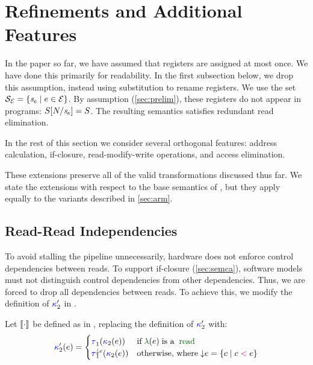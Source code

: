 \section{Refinements and Additional Features} %
\label{sec:additional}

In the paper so far, we have assumed that registers are assigned at most
once.  We have done this primarily for readability.  In the first subsection
below, we drop this assumption, instead using substitution to rename
registers.  We use the set
$\mathcal{S}_{\mathcal{E}}=\{\mathit{s}_{e}\mid e\in\mathcal{E}\}$.  By assumption
(\textsection\ref{sec:prelim}), these registers do not appear in programs:
$S[N/\mathit{s}_{e}]=S$.  The resulting semantics satisfies
redundant read elimination.

In the rest of this section we consider several orthogonal features: address
calculation, if-closure, read-modify-write operations, and access
elimination.

These extensions preserve all of the valid transformations discussed thus far.
We state the extensions with respect to the base semantics of
, but they apply equally to the variants described in
\textsection\ref{sec:arm}.

\subsection{Read-Read Independencies}
\label{sec:read-read}

To avoid stalling the \CPU{} pipeline unnecessarily, hardware does not
enforce control dependencies between reads.  To support if-closure
(\textsection\ref{sec:semca}), software models must not distinguish control
dependencies from other dependencies.  Thus, we are forced to drop all
dependencies between reads.  To achieve this, we modify the definition of
${\color{blue}\kappa}'_2$ in .
\begin{definition}
  \label{def:semrr}
  Let $\semrr{}$ be defined as in , replacing the definition
  of ${\color{blue}\kappa}'_2$ with:
  \begin{displaymath}
    \labelingForm'_2(\aEv)=
    \begin{cases}
      \aTr[1]{}{\labelingForm_2(\aEv)} & \text{if}\; \labeling(\aEv) \;\text{is a}\; \sread
      \\
      \aTr[1]{\Cdown{\aEv}}{\labelingForm_2(\aEv)} & \text{otherwise, where}\; \Cdown{\aEv}=\{ \cEv \mid \cEv \lt \aEv \}
    \end{cases}
  \end{displaymath}
\end{definition}

